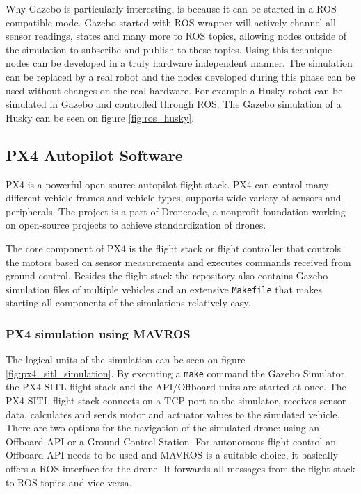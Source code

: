 Why Gazebo is particularly interesting, is because it can be started in a ROS compatible mode. Gazebo
started with ROS wrapper will actively channel all sensor readings, states and many more to ROS topics, 
allowing nodes outside of the simulation to subscribe and publish to these topics. Using this technique nodes 
can be developed in a truly hardware independent manner. The simulation can be replaced by a real robot
and the nodes developed during this phase can be used without changes on the real hardware. For example a 
Husky robot can be simulated in Gazebo and controlled through ROS. The Gazebo simulation of a Husky 
can be seen on figure \ref{fig:ros_husky}.


\subsection{PX4 Autopilot Software}
PX4 is a powerful open-source autopilot flight stack. PX4 can control many different vehicle frames and vehicle 
types, supports wide variety of sensors and peripherals. The project is a part of Dronecode, a nonprofit
foundation working on open-source projects to achieve standardization of drones.\cite{PX4Website} 

The core component of PX4 is the flight stack or flight controller that controls the motors based on sensor
measurements and executes commands received from ground control. Besides the flight stack the repository 
also contains Gazebo simulation files of multiple vehicles and an extensive \verb|Makefile| that makes 
starting all components of the simulations relatively easy. 

\subsubsection{PX4 simulation using MAVROS}
The logical units of the simulation can be seen on figure \ref{fig:px4_sitl_simulation}.
By executing a \verb|make| command the Gazebo Simulator, the PX4 SITL flight stack and the API/Offboard units
are started at once. The PX4 SITL flight stack connects on a TCP port to the simulator, receives sensor data, 
calculates and sends motor and actuator values to the simulated vehicle. There are two options for the navigation
of the simulated drone: using an Offboard API or a Ground Control Station. For autonomous flight control an 
Offboard API needs to be used and MAVROS is a suitable choice, it basically offers a ROS interface for 
the drone. It forwards all messages from the flight stack to ROS topics and vice versa.

